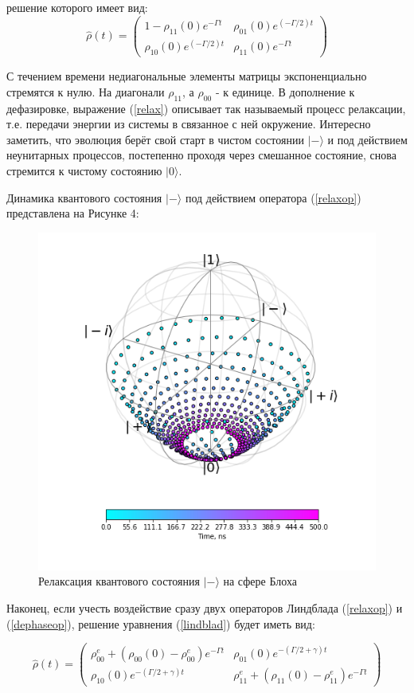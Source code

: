 \noindent решение которого имеет вид:
\begin{equation}
\label{relax}
\tag{25}
\hat\rho(t) = 
\begin{pmatrix}
1-\rho_{11}(0)e^{-\Gamma t}& \rho_{01}(0)e^{(-\Gamma/2)t}\\
\rho_{10}(0)e^{(-\Gamma/2)t}&\rho_{11}(0)e^{-\Gamma t}
\end{pmatrix}
\end{equation}

С течением времени недиагональные элементы матрицы экспоненциально стремятся к нулю. На диагонали $\rho_{11}$, а $\rho_{00}$ - к единице. В дополнение к дефазировке, выражение (\ref{relax}) описывает так называемый процесс релаксации, т.е. передачи энергии из системы в связанное с ней окружение.
Интересно заметить, что эволюция берёт свой старт в чистом состоянии $|-\rangle$ и под действием неунитарных процессов, постепенно проходя через смешанное состояние, снова стремится к чистому состоянию $|0\rangle$. 

 Динамика квантового состояния $|-\rangle$ под действием оператора (\ref{relaxop}) представлена на Рисунке 4:

\begin{figure}[h]
	\centering
	\includegraphics[width=0.4\linewidth]{pictures/Relaxation}
	\caption{Релаксация квантового состояния $|-\rangle$ на сфере Блоха}
	\label{fig:relaxation}
\end{figure}

Наконец, если учесть воздействие сразу двух операторов Линдблада (\ref{relaxop}) и (\ref{dephaseop}), решение уравнения (\ref{lindblad}) будет иметь вид:

\begin{equation}
\tag{26}
\hat \rho(t)= 
\begin{pmatrix}
\rho^e_{00}+(\rho_{00}(0)-\rho^e_{00})e^{-\Gamma t}&\rho_{01}(0)e^{-(\Gamma/2+\gamma)t}\\\rho_{10}(0)e^{-(\Gamma/2+\gamma)t} &
\rho^e_{11}+(\rho_{11}(0)-\rho^e_{11})e^{-\Gamma t}
\end{pmatrix}
\end{equation} 

